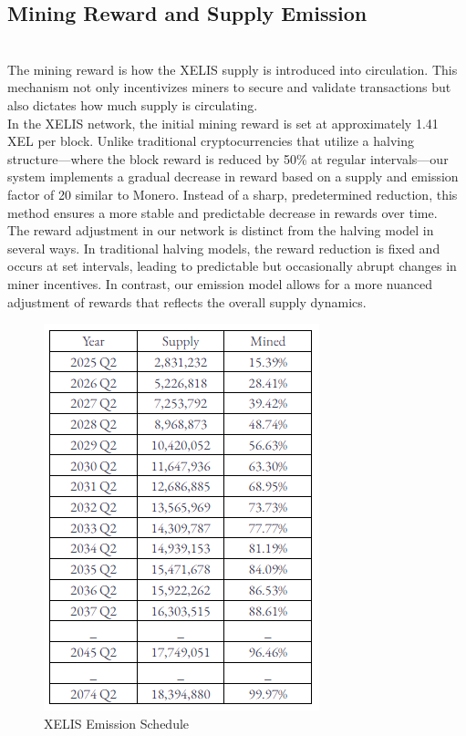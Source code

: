 \documentclass[10pt,a4paper,twocolumn]{article}
\begin{document}
\subsection{Mining Reward and Supply Emission}\\

The mining reward is how the XELIS supply is introduced into circulation. This mechanism not only incentivizes miners to secure and validate transactions but also dictates how much supply is circulating.\\

In the XELIS network, the initial mining reward is set at approximately 1.41 XEL per block. Unlike traditional cryptocurrencies that utilize a halving structure—where the block reward is reduced by 50\% at regular intervals—our system implements a gradual decrease in reward based on a supply and emission factor of 20 similar to Monero. Instead of a sharp, predetermined reduction, this method ensures a more stable and predictable decrease in rewards over time.\\

The reward adjustment in our network is distinct from the halving model in several ways. In traditional halving models, the reward reduction is fixed and occurs at set intervals, leading to predictable but occasionally abrupt changes in miner incentives. In contrast, our emission model allows for a more nuanced adjustment of rewards that reflects the overall supply dynamics.\\

\begin{figure}
    \centering
    \includegraphics[width=0.7\linewidth]{Screenshot 2024-10-23 185252.png}
    \caption{XELIS Emission Schedule}
    \label{fig:enter-label}
\end{figure}
\end{document}
